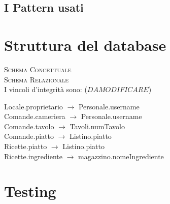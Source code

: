 \documentclass[a4paper]{article}
\begin{document}
\subsection{I Pattern usati}

\section{Struttura del database}

\textsc{Schema Concettuale}\\
\textsc{Schema Relazionale}\\

I vincoli d'integrit\`a sono: ($DA MODIFICARE$)

	Locale.proprietario $\rightarrow$ Personale.username\\
	Comande.cameriera $\rightarrow$ Personale.username \\
	Comande.tavolo $\rightarrow$ Tavoli.numTavolo \\
	Comande.piatto $\rightarrow$ Listino.piatto\\
	Ricette.piatto $\rightarrow$ Listino.piatto\\
	Ricette.ingrediente $\rightarrow$ magazzino.nomeIngrediente\\


\section{Testing}
\end{document}
